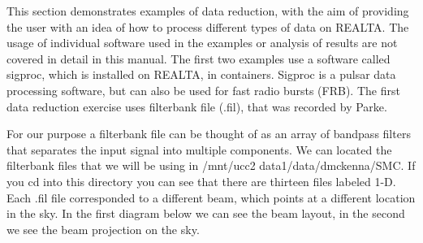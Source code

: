 \documentclass[11pt,fleqn]{book} %
\begin{document}
This section demonstrates examples of data reduction, with the aim of providing the user with an idea of how to process different types of data on REALTA. The usage of individual software used in the examples or analysis of results are not covered in detail in this manual. The first two examples use a software called sigproc, which is installed on REALTA, in containers. Sigproc is a pulsar data processing software, but can also be used for fast radio bursts (FRB). The first data reduction exercise uses filterbank file (.fil), that was recorded by Parke. 

For our purpose a filterbank file can be thought of as an array of bandpass filters that separates the input signal into multiple components. We can located the filterbank files that we will be using in  /mnt/ucc2 data1/data/dmckenna/SMC. If you cd into this directory you can see that there are thirteen files labeled 1-D. Each .fil file corresponded to a different beam, which points at a different location in the sky. In the first diagram below we can see the beam layout, in the second we see the beam projection on the sky.

\vspace{7mm}
\end{document}
